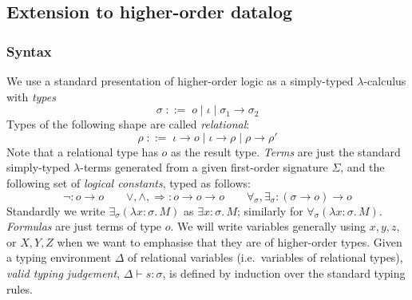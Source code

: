 
\newcommand{\abs}[2]{\lambda #1.\,{#2}}

\newcommand{\boolsort}{o}
\newcommand{\intsort}{\iota}
\newcommand{\mng}[1]{\llbracket #1 \rrbracket}
\newcommand{\mmng}[1]{\mathcal{M}\llbracket #1 \rrbracket}
\newcommand{\cmng}[1]{\mathcal{C}\llbracket #1 \rrbracket}
\newcommand{\smng}[1]{\mathcal{S}\llbracket #1 \rrbracket}
\newcommand{\makeset}[1]{\{#1\}}
\newcommand{\disjointTimesS}{\disjointTimes_S}
\newcommand{\superposeS}{{\superpose_S}}
\newcommand{\twistS}{\cplus_{\superpose_S}}
\newcommand{\lub}{\bigsqcup}
\newcommand{\truetm}{\mathsf{true}}
\newcommand{\falsetm}{\mathsf{false}}
\newcommand{\cTo}{\Rightarrow_{\rm c}}
\newcommand{\mTo}{\Rightarrow_{\rm m}}
\newcommand{\mexistsfn}{\mathsf{mexists}}
\newcommand{\mfunc}{T^\mathcal{M}}
\newcommand{\impliesfn}{\mathsf{implies}}

\newcommand{\andfn}{\mathsf{and}}
\newcommand{\mandfn}{\mathsf{mand}}
\newcommand{\andterm}{\mathsf{and}}
\newcommand{\orfn}{\mathsf{or}}
\newcommand{\morfn}{\mathsf{mor}}
\newcommand{\notfn}{\mathsf{not}}
\newcommand{\existsfn}{\mathsf{exists}}
\newcommand{\forallfn}{\mathsf{forall}}
\newcommand{\dom}{\mathrm{dom}}

\subsection{Extension to higher-order datalog}


\subsubsection{Syntax} 
We use a standard presentation of higher-order logic as a simply-typed $\lambda$-calculus with \emph{types}
\[
\sigma \; ::= \; \boolsort \mid \intsort \mid \sigma_1 \to \sigma_2
\]
Types of the following shape are called \emph{relational}:
\[
\rho \; ::= \; \intsort \to \boolsort \mid \intsort \to \rho \mid \rho \to \rho'
\]
Note that a relational type has $\boolsort$ as the result type.
\emph{Terms} are just the standard simply-typed $\lambda$-terms generated from a given first-order signature $\Sigma$, and the following set of \emph{logical constants}, typed as follows:
\[ \neg : \boolsort \to \boolsort \qquad \vee, \wedge, \Rightarrow : \boolsort \to \boolsort \to \boolsort \qquad \forall_\sigma, \exists_\sigma : (\sigma \to \boolsort) \to \boolsort\]
Standardly we write $\exists_\sigma(\abs{x\!\!:\!\!\sigma}{M})$ as $\exists x\!\!:\!\!\sigma .\, M$; similarly for $\forall_\sigma(\abs{x\!\!:\!\!\sigma}{M})$.
\emph{Formulas} are just terms of type $\boolsort$.
We will write variables generally using $x,y,z$, or $X,Y,Z$ when we want to emphasise that they are of higher-order types.
Given a typing environment $\Delta$ of relational variables (i.e.~variables of relational types), \emph{valid typing judgement}, $\Delta \vdash s : \sigma$, is defined by induction over the standard typing rules.

